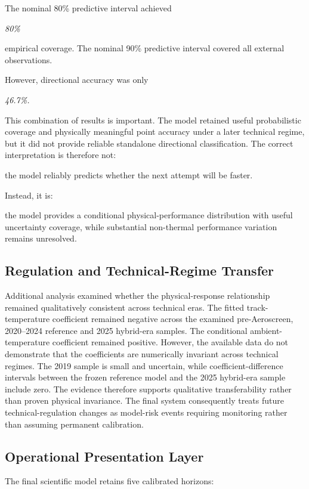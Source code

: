 The nominal 80\% predictive interval achieved

\begin{center}\textit{80\%}\end{center}

empirical coverage. The nominal 90\% predictive interval covered all external observations.

However, directional accuracy was only

\begin{center}\textit{46.7\%.}\end{center}

This combination of results is important. The model retained useful probabilistic coverage and physically meaningful point accuracy under a later technical regime, but it did not provide reliable standalone directional classification. The correct interpretation is therefore not:

the model reliably predicts whether the next attempt will be faster.

Instead, it is:

the model provides a conditional physical-performance distribution with useful uncertainty coverage, while substantial non-thermal performance variation remains unresolved.

\subsection{Regulation and Technical-Regime Transfer}
Additional analysis examined whether the physical-response relationship remained qualitatively consistent across technical eras. The fitted track-temperature coefficient remained negative across the examined pre-Aeroscreen, 2020--2024 reference and 2025 hybrid-era samples. The conditional ambient-temperature coefficient remained positive. However, the available data do not demonstrate that the coefficients are numerically invariant across technical regimes. The 2019 sample is small and uncertain, while coefficient-difference intervals between the frozen reference model and the 2025 hybrid-era sample include zero. The evidence therefore supports qualitative transferability rather than proven physical invariance. The final system consequently treats future technical-regulation changes as model-risk events requiring monitoring rather than assuming permanent calibration.

\subsection{Operational Presentation Layer}
The final scientific model retains five calibrated horizons:

